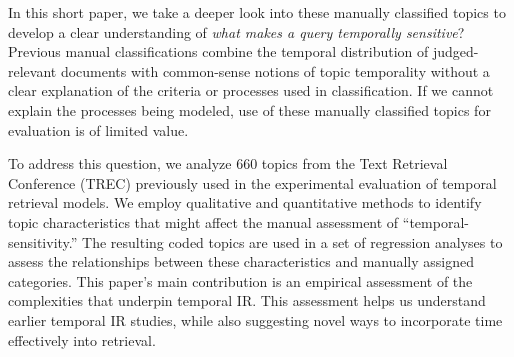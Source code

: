 \documentclass{sig-alternate-05-2015}
\begin{document}
In this short paper, we take a deeper look into these manually classified topics to develop a clear understanding of \emph{what makes a query temporally sensitive}?  Previous manual classifications combine the temporal distribution of judged-relevant documents with common-sense notions of topic temporality without a clear explanation of the criteria or processes used in classification. If we cannot explain the processes being modeled, use of these manually classified topics for evaluation is of limited value. 

To address this question, we analyze  660 topics from the Text Retrieval Conference (TREC) previously used in the experimental evaluation of temporal retrieval models. We employ qualitative and quantitative methods to identify topic characteristics that might affect the manual assessment of ``temporal-sensitivity.'' The resulting coded topics are used in a set of regression analyses to assess the relationships between these characteristics and manually assigned categories.   This paper's main contribution is an empirical assessment of the complexities that underpin temporal IR.  This assessment helps us understand earlier temporal IR studies, while also suggesting novel ways to incorporate time effectively into retrieval.

\end{document}
